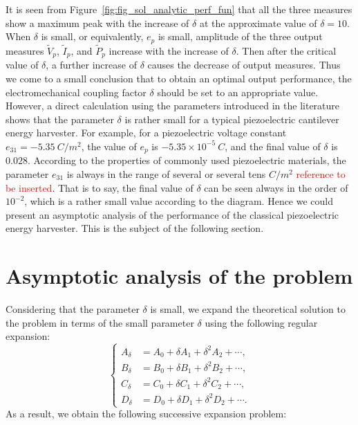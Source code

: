 \documentclass{article}
\begin{document}
It is seen from Figure~\ref{fig:fig_sol_analytic_perf_fun} that all the three measures show a maximum peak with the increase of $\delta$ at the approximate value of $\delta = 10$. When $\delta$ is small, or equivalently, $e_p$ is small, amplitude of the three output measures $\tilde{V}_p$, $\tilde{I}_p$, and $\tilde{P}_p$ increase with the increase of $\delta$. Then after the critical value of $\delta$, a further increase of $\delta$ causes the decrease of output measures. Thus we come to a small conclusion that to obtain an optimal output performance, the electromechanical coupling factor $\delta$ should be set to an appropriate value. However, a direct calculation using the parameters introduced in the literature \cite{erturk2008distributed,erturk2009experimentally} shows that the parameter $\delta$ is rather small for a typical piezoelectric cantilever energy harvester. For example, for a piezoelectric voltage constant $e_{31} = -5.35\ C / m^2$, the value of $e_p$ is $-5.35 \times 10^{-5}\ C$, and the final value of $\delta$ is $0.028$. According to the properties of commonly used piezoelectric materials, the parameter $e_{31}$ is always in the range of several or several tens $C / m^2$ \textcolor{red}{reference to be inserted}. That is to say, the final value of $\delta$ can be seen always in the order of $10^{-2}$, which is a rather small value according to the diagram. Hence we could present an asymptotic analysis of the performance of the classical piezoelectric energy harvester. This is the subject of the following section.


\section{Asymptotic analysis of the problem}

Considering that the parameter $\delta$ is small, we expand the theoretical solution to the problem in terms of the small parameter $\delta$ using the following regular expansion:
\begin{equation}
    \left\{\begin{aligned}
        A_\delta &= A_0 + \delta A_1 + \delta^2 A_2 + \cdots, \\
        B_\delta &= B_0 + \delta B_1 + \delta^2 B_2 + \cdots, \\
        C_\delta &= C_0 + \delta C_1 + \delta^2 C_2 + \cdots, \\
        D_\delta &= D_0 + \delta D_1 + \delta^2 D_2 + \cdots. 
    \end{aligned}\right.
\end{equation}
As a result, we obtain the following successive expansion problem:
\end{document}
